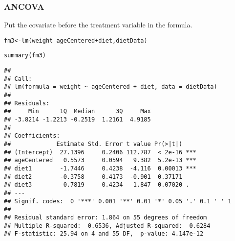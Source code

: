 \documentclass[color=usenames,dvipsnames]{beamer}\usepackage[]{graphicx}\usepackage[]{color}
\makeatletter
\newcommand{\hlopt}[1]{\textcolor[rgb]{0,0,0}{#1}}%
\newcommand{\hlstd}[1]{\textcolor[rgb]{0,0,0}{#1}}%
\newcommand{\hlkwb}[1]{\textcolor[rgb]{0,0.341,0.682}{#1}}%
\newcommand{\hlkwd}[1]{\textcolor[rgb]{0.004,0.004,0.506}{#1}}%
\newenvironment{kframe}{%
 \def\at@end@of@kframe{}%
 \ifinner\ifhmode%
  \def\at@end@of@kframe{\end{minipage}}%
  \begin{minipage}{\columnwidth}%
 \fi\fi%
 \def\FrameCommand##1{\hskip\@totalleftmargin \hskip-\fboxsep
 \colorbox{shadecolor}{##1}\hskip-\fboxsep
     \hskip-\linewidth \hskip-\@totalleftmargin \hskip\columnwidth}%
 \MakeFramed {\advance\hsize-\width
   \@totalleftmargin\z@ \linewidth\hsize
   \@setminipage}}%
 {\par\unskip\endMakeFramed%
 \at@end@of@kframe}
\newenvironment{knitrout}{}{} %
\makeatother
\begin{document}
\begin{frame}[fragile]
  \frametitle{ANCOVA}
{%
  \footnotesize
  Put the covariate before the treatment
  variable in the formula. \\}
\begin{knitrout}\tiny
{}\color{fgcolor}\begin{kframe}
\begin{alltt}
\hlstd{fm3} \hlkwb{<-} \hlkwd{lm}\hlstd{(weight} \hlopt{~} \hlstd{ageCentered} \hlopt{+} \hlstd{diet, dietData)}
\end{alltt}
\end{kframe}
\end{knitrout}
\pause
\begin{knitrout}\tiny
{}\color{fgcolor}\begin{kframe}
\begin{alltt}
\hlkwd{summary}\hlstd{(fm3)}
\end{alltt}
\begin{verbatim}
## 
## Call:
## lm(formula = weight ~ ageCentered + diet, data = dietData)
## 
## Residuals:
##     Min      1Q  Median      3Q     Max 
## -3.8214 -1.2213 -0.2519  1.2161  4.9185 
## 
## Coefficients:
##             Estimate Std. Error t value Pr(>|t|)    
## (Intercept)  27.1396     0.2406 112.787  < 2e-16 ***
## ageCentered   0.5573     0.0594   9.382  5.2e-13 ***
## diet1        -1.7446     0.4238  -4.116  0.00013 ***
## diet2        -0.3758     0.4173  -0.901  0.37171    
## diet3         0.7819     0.4234   1.847  0.07020 .  
## ---
## Signif. codes:  0 '***' 0.001 '**' 0.01 '*' 0.05 '.' 0.1 ' ' 1
## 
## Residual standard error: 1.864 on 55 degrees of freedom
## Multiple R-squared:  0.6536,	Adjusted R-squared:  0.6284 
## F-statistic: 25.94 on 4 and 55 DF,  p-value: 4.147e-12
\end{verbatim}
\end{kframe}
\end{knitrout}
\end{frame}
\end{document}
